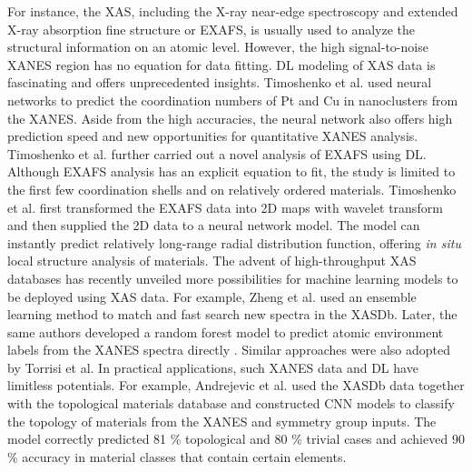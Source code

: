 \documentclass[pdflatex,sn-mathphys]{sn-jnl}%
\theoremstyle{thmstyleone}%
\theoremstyle{thmstyletwo}%
\theoremstyle{thmstylethree}%
\begin{document}
For instance, the XAS, including the X-ray near-edge spectroscopy and extended X-ray absorption fine structure or EXAFS, is usually used to analyze the structural information on an atomic level. However, the high signal-to-noise XANES region has no equation for data fitting. DL modeling of XAS data is fascinating and offers unprecedented insights. Timoshenko et al. used neural networks to predict the coordination numbers of Pt \cite{timoshenkoSupervisedMachineLearningBasedDetermination2017} and Cu \cite{timoshenkosubnano2018} in nanoclusters from the XANES. Aside from the high accuracies, the neural network also offers high prediction speed and new opportunities for quantitative XANES analysis. Timoshenko et al. \cite{timoshenkoNeuralNetworkApproach2018} further carried out a novel analysis of EXAFS using DL. Although EXAFS analysis has an explicit equation to fit, the study is limited to the first few coordination shells and on relatively ordered materials.  Timoshenko et al.  \cite{timoshenkoNeuralNetworkApproach2018} first transformed the EXAFS data into 2D maps with wavelet transform and then supplied the 2D data to a neural network model. The model can instantly predict relatively long-range radial distribution function, offering \emph{in situ} local structure analysis of materials. The advent of high-throughput XAS databases has recently unveiled more possibilities for machine learning models to be deployed using XAS data. For example, Zheng et al. \cite{zhengAutomatedGenerationEnsemblelearned2018} used an ensemble learning method to match and fast search new spectra in the XASDb. Later, the same authors developed a random forest model to predict atomic environment labels from the XANES spectra directly \cite{zhengRandomForestModels2020}. Similar approaches were also adopted by Torrisi et al. \cite{torrisiRandomForestMachine2020} In practical applications, such XANES data and DL have limitless potentials. For example, Andrejevic et al. \cite{andrejevic2020machine} used the XASDb data together with the topological materials database and constructed CNN models to classify the topology of materials from the XANES and symmetry group inputs. The model correctly predicted 81 \% topological and 80 \% trivial cases and achieved 90 \% accuracy in material classes that contain certain elements. 
\end{document}
